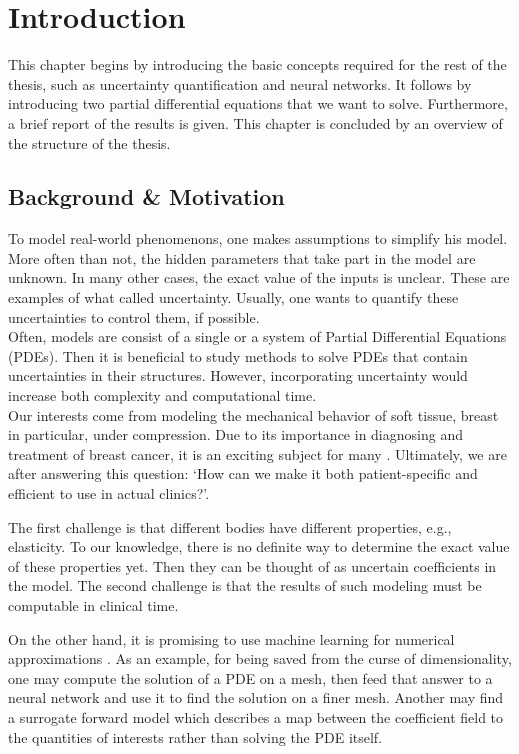 \chapter{Introduction}

\setcounter{page}{1}
This chapter begins by introducing the basic concepts required for the rest of the thesis, such as uncertainty quantification and neural networks. It follows by introducing two partial differential equations that we want to solve. Furthermore, a brief report of the results is given. This chapter is concluded by an overview of the structure of the thesis. 

\section{Background \& Motivation}
\label{sec:Background_And_Motivations}
To model real-world phenomenons, one makes assumptions to simplify his model. More often than not, the hidden parameters that take part in the model are unknown. In many other cases, the exact value of the inputs is unclear. These are examples of what called uncertainty. Usually, one wants to quantify these uncertainties to control them, if possible.\\ Often, models are consist of a single or a system of Partial Differential Equations (PDEs). Then it is beneficial to study methods to solve PDEs that contain uncertainties in their structures. However, incorporating uncertainty would increase both complexity and computational time.\\
Our interests come from modeling the mechanical behavior of soft tissue, breast in particular, under compression. Due to its importance in diagnosing and treatment of breast cancer, it is an exciting subject for many \cite{khatam2015vivo, tanner2002comparison, han2011development, azar2002methods, azar2001deformable, del2008finite, martinez2017finite}. Ultimately, we are after answering this question: `How can we make it both patient-specific and efficient to use in actual clinics?'. 

The first challenge is that different bodies have different properties, e.g., elasticity. To our knowledge, there is no definite way to determine the exact value of these properties yet. Then they can be thought of as uncertain coefficients in the model. The second challenge is that the results of such modeling must be computable in clinical time. 

On the other hand, it is promising to use machine learning for numerical approximations \cite{geneva2020modeling, smaoui2004modelling, lagaris2000neural, beck2019machine, zhang2019quantifying, parisi2003solving}. As an example, for being saved from the curse of dimensionality, one may compute the solution of a PDE on a mesh, then feed that answer to a neural network and use it to find the solution on a finer mesh. Another may find a surrogate forward model which describes a map between the coefficient field to the quantities of interests rather than solving the PDE itself. 


